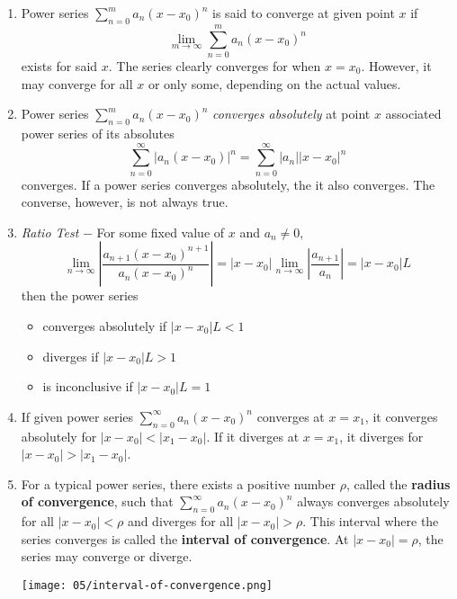 \begin{enumerate}
    \item Power series $\sum_{n=0}^m a_n {(x - x_0)}^n$ is said to converge at given point $x$ if 
        \[ \lim_{m \to \infty} \sum_{n=0}^m a_n {(x - x_0)}^n \]
        exists for said $x$. The series clearly converges for when $x = x_0$. However, it may
        converge for all $x$ or only some, depending on the actual values.
    \item Power series $\sum_{n=0}^m a_n {(x - x_0)}^n$ \textit{converges absolutely} at point $x$
        associated power series of its absolutes
        \[ \sum_{n=0}^\infty |a_n{(x - x_0)}|^n = \sum_{n=0}^\infty |a_n||x - x_0|^n \]
        converges. If a power series converges absolutely, the it also converges. The converse,
        however, is not always true.
    \item \textit{Ratio Test} $-$ For some fixed value of $x$ and $a_n \neq 0$,
        \[ \lim_{n\to\infty} \left|\frac{a_{n+1}{(x-x_0)}^{n+1}}{a_n{(x - x_0)}^n}\right|
        = |x-x_0|\lim_{n\to\infty} \left|\frac{a_{n+1}}{a_n}\right| = |x-x_0|L \]
        then the power series
        \begin{itemize}
            \item converges absolutely if $|x - x_0|L < 1$
            \item diverges if $|x - x_0|L > 1$
            \item is inconclusive if $|x - x_0|L = 1$
        \end{itemize}
    \item If given power series $\sum_{n=0}^\infty a_n{(x - x_0)}^n$ converges at $x = x_1$, it converges
        absolutely for $|x - x_0| < |x_1 - x_0|$. If it diverges at $x = x_1$, it diverges for
        $|x - x_0| > |x_1 - x_0|$.
    \item For a typical power series, there exists a positive number $\rho$, called the 
        \textbf{radius of convergence}, such that $\sum_{n=0}^\infty a_n{(x - x_0)}^n$ always converges
        absolutely for all $|x - x_0| < \rho$ and diverges for all $|x-x_0| > \rho$. This interval where
        the series converges is called the \textbf{interval of convergence}. At $|x-x_0| = \rho$, 
        the series may converge or diverge.

        \begin{center}
            \texttt{[image: 05/interval-of-convergence.png]}
        \end{center}
\end{enumerate}

